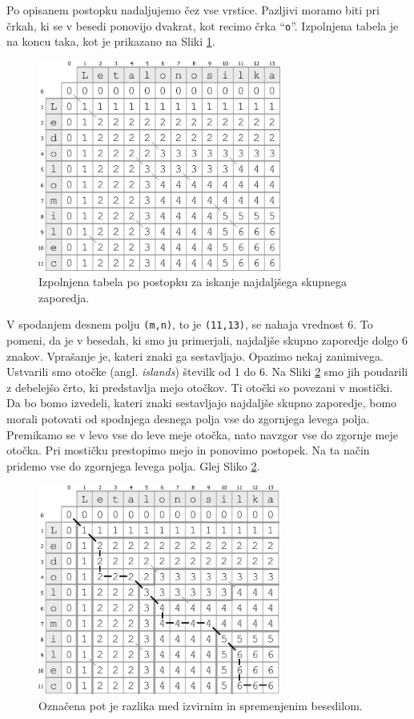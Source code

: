 \documentclass[a4paper, 12pt, twoside]{book}
\begin{document}
Po opisanem postopku nadaljujemo čez vse vrstice. Pazljivi moramo biti pri črkah, ki se v besedi ponovijo dvakrat, kot recimo črka “{\tt o}”. Izpolnjena tabela je na koncu taka, kot je prikazano na Sliki \ref{lcs4}.

\begin{figure}[placement h]
\begin{center}
\includegraphics[width=8cm]{img/lcs4.pdf}
\end{center}
\caption{Izpolnjena tabela po postopku za iskanje najdaljšega skupnega zaporedja.}
\label{lcs4}
\end{figure}

V spodanjem desnem polju {\tt (m,n)}, to je {\tt (11,13)}, se nahaja vrednost 6. To pomeni, da je v besedah, ki smo ju primerjali, najdaljše skupno zaporedje dolgo 6 znakov. Vprašanje je, kateri znaki ga sestavljajo. Opazimo nekaj zanimivega. Ustvarili smo otočke (angl. \textit{islands}) številk od 1 do 6. Na Sliki \ref{lcs5} smo jih poudarili z debelejšo črto, ki predstavlja mejo otočkov. Ti otočki so povezani v mostički. Da bo bomo izvedeli, kateri znaki sestavljajo najdaljše skupno zaporedje, bomo morali potovati od spodnjega desnega polja vse do zgornjega levega polja. Premikamo se v levo vse do leve meje otočka, nato navzgor vse do zgornje meje otočka. Pri mostičku prestopimo mejo in ponovimo postopek. Na ta način pridemo vse do zgornjega levega polja. Glej Sliko \ref{lcs5}.

\begin{figure}[placement h]
\begin{center}
\includegraphics[width=8cm]{img/lcs5.pdf}
\end{center}
\caption{Označena pot je razlika med izvirnim in spremenjenim besedilom.}
\label{lcs5}
\end{figure}
\end{document}
